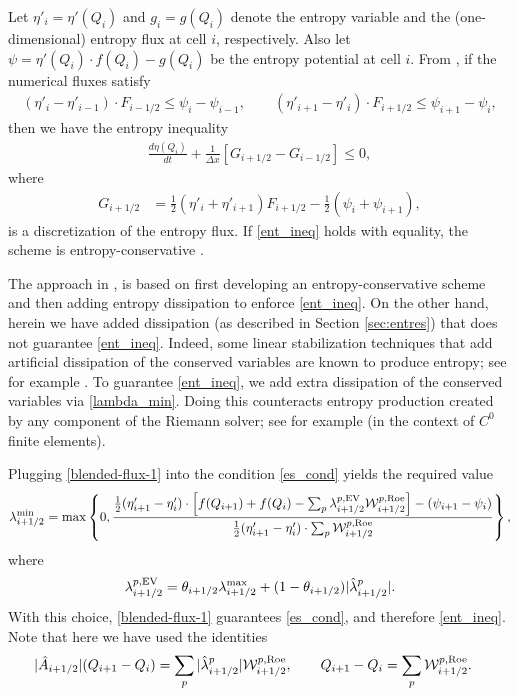 \documentclass[preprint, 11pt]{article}
\newcommand{\W}{{\mathcal W}}
\newcommand{\iph}{{i+1/2}}
\newcommand{\bff}{{f}}
\newcommand{\bfF}{{F}}
\newcommand{\entvar}{\eta'}
\newcommand{\bfq}{{Q}}
\newcommand{\Roe}{{\rm Roe}}
\newcommand{\EV}{{\rm EV}}
\newcommand{\efp}{\psi}
\newcommand{\entflux}{g}
\begin{document}
Let $\entvar_i=\entvar(\bfq_i)$ and $\entflux_i=\entflux(\bfq_i)$ denote the entropy variable and the
(one-dimensional) entropy flux at cell $i$, respectively.
Also let $\efp=\entvar(\bfq_i)\cdot \bff(\bfq_i)-\entflux(\bfq_i)$ be the entropy potential at cell $i$.
From \cite[\S 4]{tadmor1987numerical}, if the numerical fluxes satisfy
\begin{align}\label{es_cond}
(\entvar_{i}-\entvar_{i-1})\cdot \bfF_{i-1/2}\leq \efp_{i}-\efp_{i-1},
  \qquad
  (\entvar_{i+1}-\entvar_i)\cdot \bfF_{i+1/2}\leq \efp_{i+1}-\efp_i,
\end{align}
then we have the entropy inequality
\begin{align}\label{ent_ineq}
  \frac{d\eta(\bfq_i)}{dt}+\frac{1}{\Delta x}\left[G_{i+1/2}-G_{i-1/2}\right]\leq 0,
\end{align}
where
\begin{align*}
    G_{i+1/2} &= \frac{1}{2}\left(\entvar_i+\entvar_{i+1}\right)\bfF_{i+1/2}-\frac{1}{2}(\efp_{i}+\efp_{i+1}),
\end{align*}
is a discretization of the entropy flux.
If \eqref{ent_ineq} holds with equality, the scheme is entropy-conservative
\cite{tadmor2003entropy}.  

The approach in \cite{tadmor2003entropy}, is based on first developing an
entropy-conservative scheme and then adding entropy dissipation to enforce \eqref{ent_ineq}.
On the other hand, herein we have added dissipation (as described in Section \ref{sec:entres})
that does not guarantee \eqref{ent_ineq}.
Indeed, some linear stabilization techniques that add artificial dissipation of the conserved 
variables are known to produce entropy; see for example \cite{ern2013weighting,kuzmin2020entropy}. 
To guarantee \eqref{ent_ineq}, we add extra dissipation of the conserved variables via 
\eqref{lambda_min}. 
Doing this counteracts entropy production created by any component of the Riemann solver;
see for example \cite{kuzmin2020entropy} (in the context of $C^0$ finite elements). 

Plugging \eqref{blended-flux-1} into the condition \eqref{es_cond} yields the required value
\begin{align}\label{lambda_min}
  \lambda_{i+1/2}^{\min} 
  = \max\left\{0,\frac{\frac{1}{2}(\entvar_{i+1}-\entvar_{i})\cdot
    \left[\bff(\bfq_{i+1})+\bff(\bfq_{i})-\sum_p\lambda_{i+1/2}^{p,\EV}\W_{i+1/2}^{p,\Roe}\right]
    -(\efp_{i+1}-\efp_i)}
  {\frac{1}{2}(\entvar_{i+1}-\entvar_{i})\cdot\sum_p\W_{i+1/2}^{p,\Roe}}\right\},
\end{align}
where 
\begin{align*}
  \lambda_{i+1/2}^{p,\EV}=\theta_{i+1/2}\lambda_{i+1/2}^{\max}+(1-\theta_{i+1/2})|\hat{\lambda}_{i+1/2}^p|.
\end{align*}
With this choice, \eqref{blended-flux-1} guarantees \eqref{es_cond}, and therefore \eqref{ent_ineq}.
Note that here we have used the identities
\begin{align*}
|\hat{A}_\iph|(Q_{i+1}-Q_i) = \sum_p |\hat{\lambda}^p_\iph| \W^{p,\Roe}_\iph, \qquad
Q_{i+1}-Q_i & = \sum_p \W^{p,\Roe}_\iph.
\end{align*}
\end{document}
